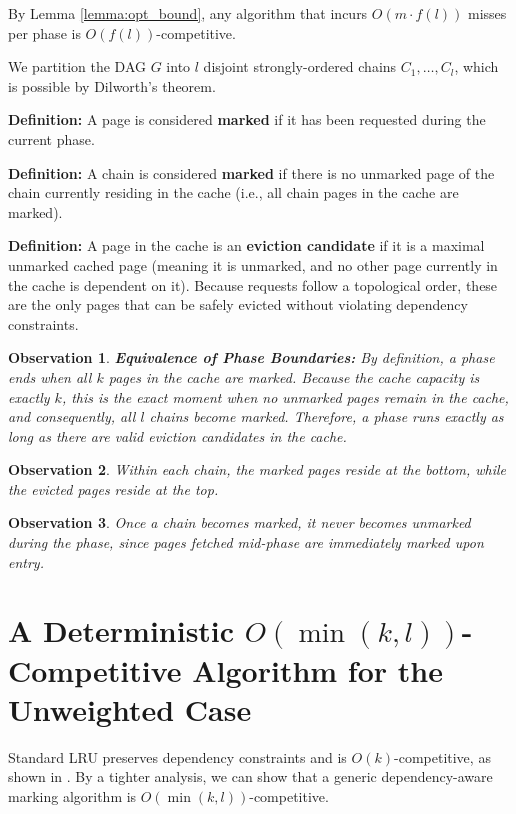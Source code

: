 \documentclass[a4paper]{article}
\newtheorem{observation}{Observation} %
\begin{document}
By Lemma \ref{lemma:opt_bound}, any algorithm that incurs $O(m \cdot f(l))$ misses per phase is $O(f(l))$-competitive.

We partition the DAG $G$ into $l$ disjoint strongly-ordered chains $C_1, \ldots, C_l$, which is possible by Dilworth's theorem. 

\noindent\textbf{Definition:} A page is considered \textbf{marked} if it has been requested during the current phase.

\noindent\textbf{Definition:} A chain is considered \textbf{marked} if there is no unmarked page of the chain currently residing in the cache (i.e., all chain pages in the cache are marked).

\noindent\textbf{Definition:} A page in the cache is an \textbf{eviction candidate} if it is a maximal unmarked cached page (meaning it is unmarked, and no other page currently in the cache is dependent on it). Because requests follow a topological order, these are the only pages that can be safely evicted without violating dependency constraints.

\begin{observation}
\label{obs:phase_termination}
\textbf{Equivalence of Phase Boundaries:} By definition, a phase ends when all $k$ pages in the cache are marked. Because the cache capacity is exactly $k$, this is the exact moment when no unmarked pages remain in the cache, and consequently, all $l$ chains become marked. Therefore, a phase runs exactly as long as there are valid eviction candidates in the cache.
\end{observation}

\begin{observation}
Within each chain, the marked pages reside at the bottom, while the evicted pages reside at the top.
\end{observation}

\begin{observation}
\label{obs:marked_chain_monotonicity}
Once a chain becomes marked, it never becomes unmarked during the phase, since pages fetched mid-phase are immediately marked upon entry.
\end{observation}

\section{A Deterministic $O(\min(k,l))$-Competitive Algorithm for the \\ Unweighted Case}
Standard LRU preserves dependency constraints and is $O(k)$-competitive, as shown in \cite{dallot2024dependency}. By a tighter analysis, we can show that a generic dependency-aware marking algorithm is $O(\min(k,l))$-competitive. 
\end{document}
